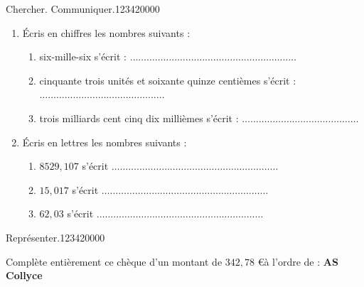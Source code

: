 \begin{pageParcourst}

  
 
\begin{ExoCt}{Chercher. Communiquer.}{1234}{2}{0}{0}{0}{0}
 

\begin{enumerate}
\item  Écris en chiffres les nombres suivants :
\begin{enumerate}
\item six-mille-six  s'écrit  :  $\ldots\ldots\ldots\ldots\ldots\ldots\ldots\ldots\ldots\ldots\ldots\ldots\ldots\ldots\ldots\ldots\ldots\ldots\ldots\ldots$\vspace{0.3cm}
\item cinquante trois unités et soixante quinze centièmes s'écrit :  $\ldots\ldots\ldots\ldots\ldots\ldots\ldots\ldots\ldots\ldots\ldots\ldots\ldots\ldots\ldots$\vspace{0.3cm}
\item trois milliards cent cinq dix millièmes s'écrit :  $\ldots\ldots\ldots\ldots\ldots\ldots\ldots\ldots\ldots\ldots\ldots\ldots\ldots\ldots$\vspace{0.3cm}
\end{enumerate}
\item  Écris en lettres les nombres suivants :
\begin{enumerate}
\item $8 529, 107$ s'écrit $\ldots\ldots\ldots\ldots\ldots\ldots\ldots\ldots\ldots\ldots\ldots\ldots\ldots\ldots\ldots\ldots\ldots\ldots\ldots\ldots$\vspace{0.3cm}
 \item $15,017$ s'écrit $\ldots\ldots\ldots\ldots\ldots\ldots\ldots\ldots\ldots\ldots\ldots\ldots\ldots\ldots\ldots\ldots\ldots\ldots\ldots\ldots$ \vspace{0.3cm}
 \item $62,03$  s'écrit $\ldots\ldots\ldots\ldots\ldots\ldots\ldots\ldots\ldots\ldots\ldots\ldots\ldots\ldots\ldots\ldots\ldots\ldots\ldots\ldots$
\end{enumerate}
\end{enumerate}

\end{ExoCt}
 
\begin{ExoCt}{Représenter.}{1234}{2}{0}{0}{0}{0}
 

Complète entièrement ce chèque d'un montant de $342,78$ \euro à l'ordre de : \textbf{AS Collyce}


\end{ExoCt}
\end{pageParcourst}
